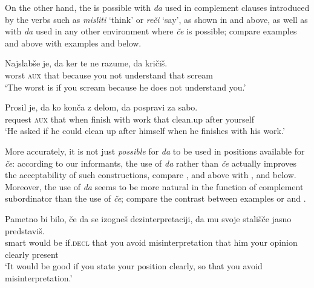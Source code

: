 \documentclass[output=paper,colorlinks,citecolor=brown]{langsci/langscibook}
\begin{document}
\noindent On the other hand, the  is possible with \textit{da} used in complement clauses introduced by the verbs such as \textit{misliti} `think' or \textit{reči} `say', as shown in  and  above, as well as with \textit{da} used in any other environment where \textit{če} is possible; compare examples  and  above with examples  and  below.

\begin{exe}
\ex \label{ex:plesnicar:nineteen}
\gll Najslabše	je, 	da 	ker 		te	ne 	razume, 	da 	kričiš.\\
 worst		\textsc{aux}	that	because	you	not	understand	that     scream \\
\trans `The worst is if you scream because he does not understand you.'
\end{exe}

\begin{exe}
\ex \label{ex:plesnicar:twenty}
\gll Prosil 		je, 	da 	ko 	konča	 z 	delom, da 	pospravi za 	sabo.\\
request		\textsc{aux}	that	when	finish	with	work	that 	clean.up after	yourself \\
\trans `He asked if he could clean up after himself when he finishes with his work.'
\end{exe}

\noindent More accurately, it is not just \textit{possible} for \textit{da} to be used in positions available for \textit{če}: according to our informants, the use of \textit{da} rather than \textit{če} actually improves the acceptability of such  constructions, compare ,  and  above with ,  and  below. Moreover, the use of \textit{da} seems to be more natural in the function of complement subordinator than the use of \textit{če}; compare the contrast between examples  or  and .

\begin{exe}
\ex \label{ex:plesnicar:twentyone}
\gll Pametno 	bi 	bilo, 	če 	da 	se 	izogneš 	dezinterpretaciji, da	mu	svoje	stališče		jasno	predstaviš.\\
smart	would	be if.\textsc{decl} that you	avoid 	misinterpretation that	him	your	opinion	clearly	present \\
\trans `It would be good if you state your position clearly, so that you avoid misinterpretation.'
\end{exe}
\end{document}
